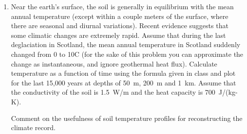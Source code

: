 \documentclass{template}
\newcommand{\solution}[1]{%
\iftoggle{showanswers}{%
\begin{solutionbox}
        #1
\end{solutionbox}%
  }{}%
}
\begin{document}
\begin{enumerate}[label=\textbf{\arabic*.}]
\begin{enumerate}[label=\Alph*)]
\end{enumerate}

\item Near the earth's surface, the soil is generally in equilibrium with the mean annual temperature (except within a couple meters of the surface, where there are seasonal and diurnal variations). Recent evidence suggests that some climatic changes are extremely rapid. Assume that during the last deglaciation in Scotland, the mean annual temperature in Scotland suddenly changed from 0 to 10\textdegree C (for the sake of this problem you can approximate the change as instantaneous, and ignore geothermal heat flux). Calculate temperature as a function of time using the formula given in class and plot for the last 15,000 years at depths of 50~m, 200~m and 1~km. Assume that the conductivity of the soil is 1.5~W/m and the heat capacity is 700~J/(kg-K).

Comment on the usefulness of soil temperature profiles for reconstructing the climate record.
\solution{

    Using the equation discussed in lecture:

    \begin{equation}
        T(z, t) = \Delta T \operatorname{erfc}\left(\frac{z}{2\sqrt{\kappa t}}\right) + T_0
    \end{equation}

    where:

    \begin{itemize}
        \item $T_0 = 0\degree$C; initial temperature
        \item $\Delta T = (T_f - T_0) = -10\degree$C; change in temperature
        \item $z$ = 50~m, 200~m and 1~km; depth
        \item $\kappa = \frac{k}{\rho C_p}$; thermal diffusivity
        \begin{itemize}
            \item $k$ = 1.5~W/m; thermal conductivity
            \item $\rho$ = 2650 (kg/m$^3$); density (taken from previous questions)
            \item $C_p$ = 700~J/(kg-K); heat capacity
        \end{itemize}
    \end{itemize}

}
\end{enumerate}
\end{document}
